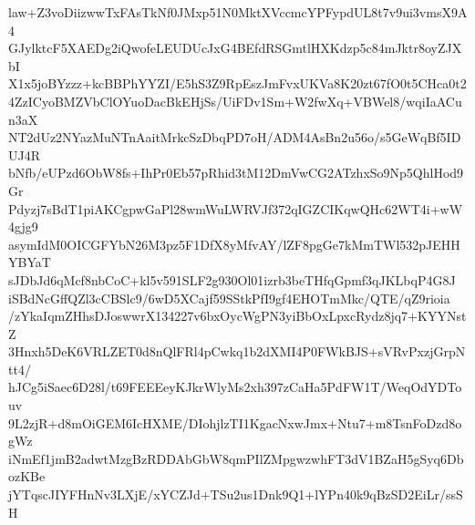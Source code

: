 law+Z3voDiizwwTxFAsTkNf0JMxp51N0MktXVccmcYPFypdUL8t7v9ui3vmsX9A4
GJylktcF5XAEDg2iQwofeLEUDUcJxG4BEfdRSGmtlHXKdzp5c84mJktr8oyZJXbI
X1x5joBYzzz+kcBBPhYYZI/E5hS3Z9RpEszJmFvxUKVa8K20zt67fO0t5CHca0t2
4ZzICyoBMZVbClOYuoDacBkEHjSs/UiFDv1Sm+W2fwXq+VBWel8/wqiIaACun3aX
NT2dUz2NYazMuNTnAaitMrkcSzDbqPD7oH/ADM4AsBn2u56o/s5GeWqBf5IDUJ4R
bNfb/eUPzd6ObW8fs+IhPr0Eb57pRhid3tM12DmVwCG2ATzhxSo9Np5QhlHod9Gr
Pdyzj7sBdT1piAKCgpwGaPl28wmWuLWRVJf372qIGZCIKqwQHc62WT4i+wW4gjg9
asymIdM0OICGFYbN26M3pz5F1DfX8yMfvAY/lZF8pgGe7kMmTWl532pJEHHYBYaT
sJDbJd6qMcf8nbCoC+kl5v591SLF2g930Ol01izrb3beTHfqGpmf3qJKLbqP4G8J
iSBdNcGffQZl3cCBSlc9/6wD5XCajf59SStkPfI9gf4EHOTmMkc/QTE/qZ9rioia
/zYkaIqmZHhsDJoswwrX134227v6bxOycWgPN3yiBbOxLpxcRydz8jq7+KYYNstZ
3Hnxh5DeK6VRLZET0d8nQlFRl4pCwkq1b2dXMI4P0FWkBJS+sVRvPxzjGrpNtt4/
hJCg5iSaec6D28l/t69FEEEeyKJkrWlyMs2xh397zCaHa5PdFW1T/WeqOdYDTouv
9L2zjR+d8mOiGEM6IcHXME/DIohjlzTI1KgacNxwJmx+Ntu7+m8TsnFoDzd8ogWz
iNmEf1jmB2adwtMzgBzRDDAbGbW8qmPIlZMpgwzwhFT3dV1BZaH5gSyq6DbozKBe
jYTqscJIYFHnNv3LXjE/xYCZJd+TSu2us1Dnk9Q1+lYPn40k9qBzSD2EiLr/ssSH
